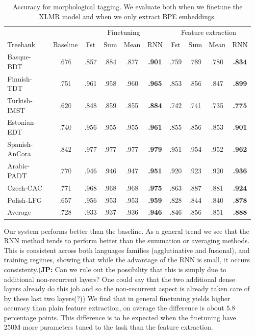 \documentclass[11pt]{article}
\newcommand\jp[1]{(\textbf{JP:} #1)}
\begin{document}
    \begin{table}%
	\centering
	\begin{tabular}{l|c|cccc|cccc}
		& & \multicolumn{4}{c}{Finetuning} & \multicolumn{4}{c}{Feature extraction} \\
		Treebank & Baseline & Fst & Sum & Mean & RNN & Fst & Sum & Mean & RNN \\
		\hline
		Basque-BDT      & .676 & .857 & .884 & .877 & \textbf{.901} & .759 & .789 & .780 & \textbf{.834} \\
		Finnish-TDT     & .751 & .961 & .958 & .960 & \textbf{.965} & .853 & .856 & .847 & \textbf{.899} \\
		Turkish-IMST    & .620 & .848 & .859 & .855 & \textbf{.884} & .742 & .741 & .735 & \textbf{.775} \\
		Estonian-EDT    & .740 & .956 & .955 & .955 & \textbf{.961} & .855 & .856 & .853 & \textbf{.901} \\
		Spanish-AnCora  & .842 & .977 & .977 & .977 & \textbf{.979} & .951 & .954 & .952 & \textbf{.962} \\
		Arabic-PADT     & .770 & .946 & .946 & .947 & \textbf{.951} & .920 & .923 & .920 & \textbf{.936} \\
		Czech-CAC       & .771 & .968 & .968 & .968 & \textbf{.975} & .863 & .887 & .881 & \textbf{.924} \\
		Polish-LFG      & .657 & .956 & .953 & .953 & \textbf{.959} & .828 & .844 & .840 & \textbf{.878} \\
        \hline
        Average         & .728 & .933 & .937 & .936 & \textbf{.946} & .846 & .856 & .851 & \textbf{.888} \\
	\end{tabular}
    	\caption{\label{tab:results_tokens} Accuracy for morphological
        tagging. We evaluate both when we finetune the XLMR model and
        when we only extract BPE embeddings.}
    \end{table}


        Our system performs better than the baseline. As a general
        trend we see that the RNN method tends to perform better
        than the summation or averaging methods. This is consistent
        across both languages families (agglutinative and fusional),
        and training regimes, showing that while the advantage of the RNN is
        small, it occurs consistenty.\jp{Can we rule out the possibility that this is simply due to additional non-recurrent layers? One could say that the two additional dense layers already do this job and so the non-recurrent aspect is already taken care of by these last two layers(?)}
        We find that in general finetuning yields higher accuracy than
        plain feature extraction, on average the difference is about $5.8$
        percentage points.  This difference is to be expected when the
        finetuning have 250M more parameters tuned to the task than the
        feature extraction. %
    
\end{document}
